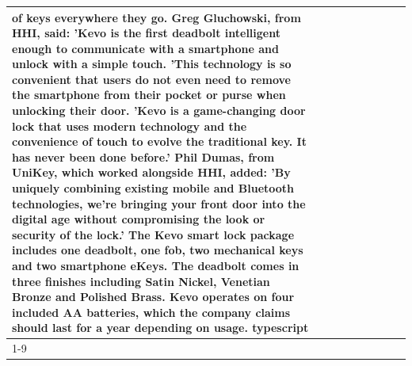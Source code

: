 \begin{table}[H]
\begin{tabular}{lllrlllll}
of keys everywhere they go. Greg Gluchowski, from HHI, said: 'Kevo is the first deadbolt intelligent enough to communicate with a smartphone and unlock with a simple touch. 'This technology is so convenient that users do not even need to remove the smartphone from their pocket or purse when unlocking their door. 'Kevo is a game-changing door lock that uses modern technology and the convenience of touch to evolve the traditional key. It has never been done before.' Phil Dumas, from UniKey, which worked alongside HHI, added: 'By uniquely combining existing mobile and Bluetooth technologies, we’re bringing your front door into the digital age without compromising the look or security of the lock.' The Kevo smart lock package includes one deadbolt, one fob, two mechanical keys and two smartphone eKeys. The deadbolt comes in three finishes including Satin Nickel, Venetian Bronze and Polished Brass. Kevo operates on four included AA batteries, which the company claims should last for a year depending on usage. typescript \\
\cline{1-9}

\end{tabular}
\end{table}

